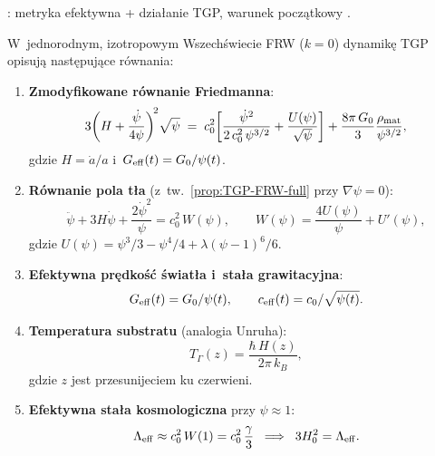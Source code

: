 \begin{proposition}%
\label{prop:cosmo-system}
: metryka efektywna + dzia\l{}anie TGP,
warunek pocz\k{a}tkowy .

\medskip
W~jednorodnym, izotropowym Wszech\'swiecie FRW ($k=0$)
dynamik\k{e} TGP opisuj\k{a} nast\k{e}puj\k{a}ce r\'ownania:

\begin{enumerate}[(1)]
\item \textbf{Zmodyfikowane r\'ownanie Friedmanna}:
\begin{equation}\label{eq:friedmann-cosmo-full}
  3\!\left(H + \frac{\dot\psi}{4\psi}\right)^{\!2}\!\sqrt\psi
  \;=\; c_0^2\!\left[\frac{\dot\psi^2}{2\,c_0^2\,\psi^{3/2}}
  + \frac{U(\psi)}{\sqrt\psi}\right]
  + \frac{8\pi\,G_0}{3}\frac{\rho_{\rm mat}}{\psi^{3/2}},
\end{equation}
gdzie $H = \dot a/a$ i~$G_{\rm eff}(t) = G_0/\psi(t)$.

\item \textbf{R\'ownanie pola t\l{}a} (z~tw.~\ref{prop:TGP-FRW-full}
przy $\nabla\psi = 0$):
\begin{equation}\label{eq:psi-background}
  \ddot\psi + 3H\dot\psi + \frac{2\dot\psi^2}{\psi}
  = c_0^2\,W(\psi),
  \qquad W(\psi) = \frac{4U(\psi)}{\psi} + U'(\psi),
\end{equation}
gdzie $U(\psi) = \psi^3/3 - \psi^4/4 + \lambda(\psi-1)^6/6$.

\item \textbf{Efektywna pr\k{e}dko\'s\'c \'swiat\l{}a i~sta\l{}a grawitacyjna}:
\begin{equation}\label{eq:Geff-ceff}
  G_{\rm eff}(t) = G_0/\psi(t),
  \qquad
  c_{\rm eff}(t) = c_0/\sqrt{\psi(t)}.
\end{equation}

\item \textbf{Temperatura substratu} (analogia Unruha):
\begin{equation}\label{eq:TGamma-cosmo}
  T_\Gamma(z) = \frac{\hbar\,H(z)}{2\pi\,k_B},
\end{equation}
gdzie $z$ jest przesunijeciem ku czerwieni.

\item \textbf{Efektywna sta\l{}a kosmologiczna} przy $\psi \approx 1$:
\begin{equation}\label{eq:Lambda-eff-cosmo}
  \Lambda_{\rm eff} \approx c_0^2\,W(1) = c_0^2\,\frac{\gamma}{3}
  \;\;\Longrightarrow\;\;
  3H_0^2 = \Lambda_{\rm eff}.
\end{equation}
\end{enumerate}


\end{proposition}

